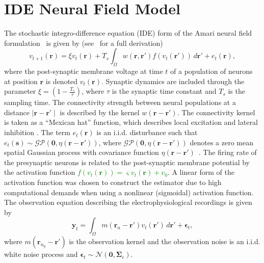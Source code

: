 \documentclass[journal,a4paper]{IEEEtran}
\newcommand{\dean}[1]{\textcolor{green}{#1}}
\begin{document}
\section{IDE Neural Field Model}
The stochastic integro-difference equation (IDE) form of the Amari neural field  formulation~\cite{Amari1977} is given by (see~\cite{Freestone2011} for a full derivation)
\begin{equation}\label{eq:DiscreteTimeModel}
	v_{t+1}\left(\mathbf{r}\right) = 
	\xi v_t\left(\mathbf{r}\right) + 
	T_s \int_\Omega { 
	    w\left(\mathbf{r},\mathbf{r'}\right)
	    f\left(v_t\left(\mathbf{r}'\right)\right) 
	\, d\mathbf{r}'} 
	+ e_t\left(\mathbf{r}\right), 
\end{equation}
where the post-synaptic membrane voltage at time $t$ of a population of neurons at position $\mathbf r$ is denoted $v_t\left(\mathbf r\right)$. Synaptic dynamics are included through the parameter $\xi=\left(1-\frac{ T_s}{\tau}\right)$, where $\tau$ is the synaptic time constant and $T_s$ is the sampling time. The connectivity strength between neural populations at a distance $\mid\mathbf{r}-\mathbf{r'}\mid$ is described by the kernel $w\left(\mathbf{r}-\mathbf{r}'\right)$. The connectivity kernel is taken as a ``Mexican hat'' function, which describes local excitation and lateral inhibition \cite{Amari1977}. The term $e_t(\mathbf r)$ is an i.i.d. disturbance such that $e_t(\mathbf{s})\sim\mathcal{GP}(\mathbf 0,\eta(\mathbf{r}-\mathbf{r'}))$, where $\mathcal{GP}(\mathbf 0,\eta(\mathbf{r}-\mathbf{r'}))$  denotes a zero mean spatial Gaussian process with covariance function $\eta(\mathbf{r}-\mathbf{r'})$~\cite{Rasmussen2005}. The firing rate of the presynaptic neurons is related to the post-synaptic membrane potential by the activation function \dean{$f(v_t(\mathbf{r})) = \varsigma v_t(\mathbf{r}) + v_0$}. A linear form of the activation function was chosen to construct the estimator due to high computational demands when using a nonlinear (sigmoidal) activation function. The observation equation describing the electrophysiological recordings is given by 
\begin{equation}\label{eq:ObservationEquation}
	\mathbf y_t = \int_{\Omega} { m\left(\mathbf{r}_{n}-\mathbf{r}'\right) v_t\left(\mathbf{r}'\right) \, d\mathbf{r}'} + \boldsymbol\epsilon_t, 
\end{equation}
where $m\left(\mathbf{r}_{n_y}-\mathbf{r}'\right)$ is the observation kernel and the observation noise is an i.i.d. white noise process and $\boldsymbol{\epsilon}_{t}\sim \mathcal{N}\left(\mathbf{0},\mathbf{\Sigma}_{\epsilon}\right)$. %
\end{document}
